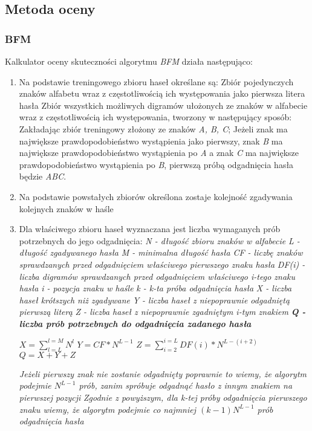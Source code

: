 \documentclass{article}
\begin{document}
	\subsection{Metoda oceny}
	\subsubsection{BFM}
	Kalkulator oceny skuteczności algorytmu \textit{BFM} działa następująco:
	\begin{enumerate}
		\item Na podstawie treningowego zbioru haseł określane są:
		\subitem Zbiór pojedynczych znaków alfabetu wraz z częstotliwością ich występowania jako pierwsza litera hasła 
		\subitem Zbiór wszystkich możliwych digramów ułożonych ze znaków w alfabecie wraz z częstotliwością ich występowania, tworzony w następujący sposób:
		\subsubitem Zakładając zbiór treningowy złożony ze znaków \textit{A, B, C}; Jeżeli znak  ma największe prawdopodobieństwo wystąpienia jako pierwszy, znak \textit{B} ma największe prawdopodobieństwo wystąpienia po \textit{A} a znak \textit{C} ma największe prawdopodobieństwo wystąpienia po \textit{B}, pierwszą próbą odgadnięcia hasła będzie \textit{ABC}.
		\item Na podstawie powstałych zbiorów określona zostaje kolejność zgadywania kolejnych znaków w haśle	
		
		\newpage
		\item Dla właściwego zbioru haseł wyznaczana jest liczba wymaganych prób potrzebnych do jego odgadnięcia:
		\subitem \textit{N - długość zbioru znaków w alfabecie}
		\subitem \textit{L - długość zgadywanego hasła}
		\subitem \textit{M - minimalna długość hasła}
		\subitem \textit{CF - liczbę znaków sprawdzanych przed odgadnięciem właściwego pierwszego znaku hasła}
		\subitem \textit{DF(i) - liczba digramów sprawdzanych przed odgadnięciem właściwego i-tego znaku hasła}
		\subitem \textit{i - pozycja znaku w haśle}
		\subitem \textit{k - k-ta próba odgadnięcia hasła}
		\subitem \textit{X - liczba haseł krótszych niż zgadywane}
		\subitem \textit{Y - liczba haseł z niepoprawnie odgadniętą pierwszą literą}
		\subitem \textit{Z - liczba haseł z niepoprawnie zgadniętym i-tym znakiem}
		\subitem \textbf{\textit{Q - liczba prób potrzebnych do odgadnięcia zadanego hasła}}
		
		\subitem $ X = \sum_{l = L}^{l = M} N^l $		
		\subitem $ Y = CF * N^{L-1} $		
		\subitem $ Z = \sum_{i = 2}^{i = L} DF(i) * N^{L - (i + 2)} $		
		\subitem $ Q = X + Y + Z $
		
		\subitem \textit{Jeżeli pierwszy znak nie zostanie odgadnięty poprawnie to wiemy, że algorytm podejmie $ N^{L-1} $ prób, zanim spróbuje odgadnąć hasło z innym znakiem na pierwszej pozycji}
		\subitem \textit{Zgodnie z powyższym, dla k-tej próby odgadnięcia pierwszego znaku wiemy, że algorytm podejmie co najmniej $ (k-1)N^{L-1} $ prób odgadnięcia hasła}
	\end{enumerate}
	
\end{document}
